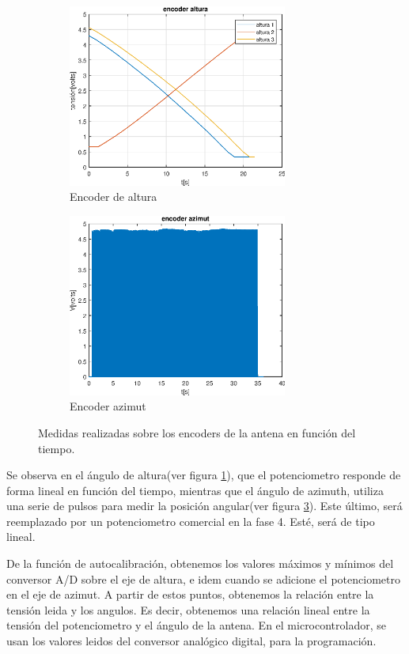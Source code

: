 \begin{figure}[ht]
    \hspace{-10mm}
	\begin{subfigure}[t]{0.5\textwidth}
		\includegraphics[width=\textwidth,height=6cm]{medidas_cenit} 
		\caption{Encoder de altura} 
		\label{subfig:altura} 
	\end{subfigure}
	\hspace{10mm}	
	\begin{subfigure}[t]{0.5\textwidth}
		\includegraphics[width=\textwidth,height=6cm]{medidas_azimut}
		\caption{Encoder azimut}  
		\label{subfig:azimut} 
	\end{subfigure}
	\caption{Medidas realizadas sobre los encoders de la antena en función del tiempo.}
\end{figure}


Se observa en el ángulo de altura(ver figura \ref{subfig:altura}), que el potenciometro responde de forma lineal en función del tiempo, mientras que el ángulo de azimuth, utiliza una serie de pulsos para medir la posición angular(ver figura  \ref{subfig:azimut}). Este último, será reemplazado por un potenciometro comercial en la fase 4. Esté, será de tipo lineal. 

De la función de autocalibración, obtenemos los valores máximos y mínimos del conversor A/D sobre el eje de altura, e idem cuando se adicione el potenciometro en el eje de azimut. A partir de estos puntos, obtenemos la relación entre la tensión leida y los angulos. Es decir, obtenemos una relación lineal entre la tensión del potenciometro y el ángulo de la antena. En el microcontrolador, se usan los valores leidos del conversor analógico digital, para la programación.

